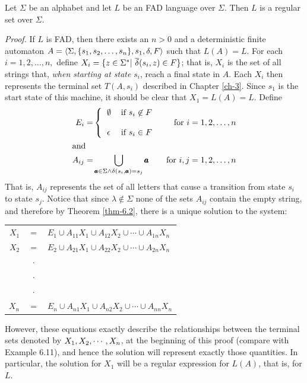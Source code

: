 \begin{thm}\label{thm-6.3}
Let $\Sigma$ be an alphabet and let $L$ be an FAD language over $\Sigma$. Then
$L$ is a regular set over $\Sigma$.

\emph{Proof.} If $L$ is FAD, then there exists an $n > 0$ and a deterministic
finite automaton $A=\langle\Sigma,\{s_1,s_2, \ldots,\\s_n\},s_1,\delta,F\rangle$
such that $L(A) = L$. For each $i = 1,2,\ldots ,n,$ define $X_i=\{z \in \Sigma^*
|\ \overline{\delta}(s_i,z) \in F\}$; that is, $X_i$ is the set of all strings that, \emph{when
starting at state} $s_i$, reach a final state in $A$. Each $X_i$ then represents
the terminal set $T(A,s_i)$ described in Chapter \ref{ch-3}. Since $s_1$ is the start state
of this machine, it should be clear that $X_1 = L(A) = L$. Define
\begin{align*}
E_i = & \left\{ \begin{tabular}{ll}
			$\emptyset$ & if $s_i \not \in F$ \\
			& \\
			$\epsilon$ & if $s_i \in F$
		 \end{tabular}\right. &
		 \text{for }i = 1,2,\ldots,n \\
\intertext{and}
A_{ij} = & \bigcup\limits_{\pmb{a}\in \Sigma \wedge \delta(s_i,\pmb{a}) = 
	s_j} \pmb{a} & \text{for }i,j=1,2, \ldots ,n
\end{align*}
That is, $A_{ij}$ represents the set of all letters that cause a transition from
state $s_i$ to state $s_j$. Notice that since $\lambda\not \in\Sigma$ none of the
sets $A_{ij}$ contain the empty string, and therefore by Theorem \ref{thm-6.2}, there is a
unique solution to the system:
\begin{center}\begin{tabular}{rcl}
$X_1$ & $=$ & $E_1 \cup A_{11}X_1 \cup A_{12}X_2 \cup \cdots \cup A_{1n}X_n$ \\
$X_2$ & $=$ & $E_2 \cup A_{21}X_1 \cup A_{22}X_2 \cup \cdots \cup A_{2n}X_n$ \\
& $\cdot$ & \\ & $\cdot$ & \\ & $\cdot$ & \\
$X_n$ & $=$ & $E_n \cup A_{n1}X_1 \cup A_{n2}X_2 \cup \cdots \cup A_{nn}X_n$
\end{tabular}\end{center}
However, these equations exactly describe the relationships between the terminal
sets denoted by $X_1,X_2, \cdots ,\\X_n$, at the beginning of this proof (compare
with Example 6.11), and hence the solution will represent exactly those
quantities. In particular, the solution for $X_1$ will be a regular expression
for $L(A)$, that is, for $L$.
\end{thm}

